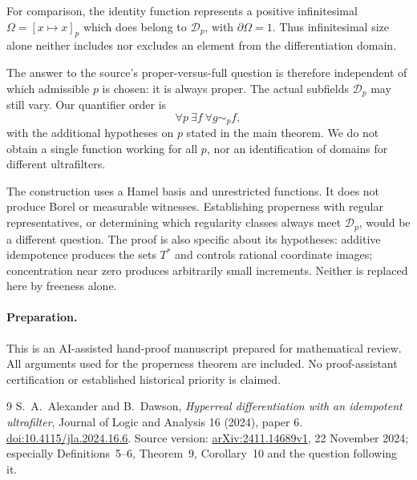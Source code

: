 \documentclass[11pt]{article}
\begin{document}
For comparison, the identity function represents a positive infinitesimal
$\Omega=[x\mapsto x]_p$ which does belong to $\mathcal D_p$, with
$\partial\Omega=1$. Thus infinitesimal size alone neither includes
nor excludes an element from the differentiation domain.

The answer to the source's proper-versus-full question is therefore
independent of which admissible $p$ is chosen: it is always proper.
The actual subfields $\mathcal D_p$ may still vary. Our quantifier order
is
\[
 \forall p\ \exists f\ \forall g\sim_p f,
\]
with the additional hypotheses on $p$ stated in the main theorem.
We do not obtain a single function working for all $p$, nor an
identification of domains for different ultrafilters.

The construction uses a Hamel basis and unrestricted functions. It does
not produce Borel or measurable witnesses. Establishing properness with
regular representatives, or determining which regularity classes always
meet $\mathcal D_p$, would be a different question. The proof is also
specific about its hypotheses: additive idempotence produces the sets
$T^*$ and controls rational coordinate images; concentration near zero
produces arbitrarily small increments. Neither is replaced here by
freeness alone.

\paragraph{Preparation.}
This is an AI-assisted hand-proof manuscript prepared for mathematical
review. All arguments used for the properness theorem are included.
No proof-assistant certification or established historical priority is
claimed.

\begin{thebibliography}{9}
 S.~A.~Alexander and B.~Dawson,
\emph{Hyperreal differentiation with an idempotent ultrafilter},
Journal of Logic and Analysis 16 (2024), paper 6.
\href{https://doi.org/10.4115/jla.2024.16.6}{doi:10.4115/jla.2024.16.6}.
Source version: \href{https://arxiv.org/abs/2411.14689v1}{arXiv:2411.14689v1},
22 November 2024; especially Definitions~5--6, Theorem~9, Corollary~10
and the question following it.
\end{thebibliography}
\end{document}
